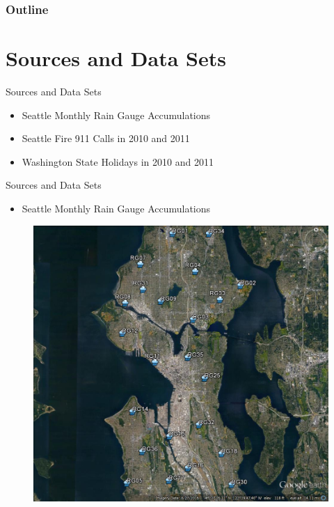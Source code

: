 \documentclass[t,11pt,compress,xcolor=table,hyperref={bookmarks=false}]{beamer}
\begin{document}
\begin{frame}
\frametitle{Outline}
\tableofcontents
\end{frame}




\section{Sources and Data Sets}


\begin{frame}{Sources and Data Sets}
\vspace{0.3cm}
\begin{itemize}
\Large
\item Seattle Monthly Rain Gauge Accumulations \cite{Daniels2018}
\item Seattle Fire 911 Calls in 2010 and 2011 \cite{FireData2018}
\item Washington State Holidays in 2010 and 2011 \cite{OfficeHolidays2010,OfficeHolidays2011}
\end{itemize}
\end{frame}



\begin{frame}{Sources and Data Sets}
\begin{itemize}
\item {\Large Seattle Monthly Rain Gauge Accumulations \cite{Daniels2018}}
\end{itemize}
\vspace{-0.6cm}
\begin{figure}[ht!]
\centering
\includegraphics[scale=0.18]{figs/SPU_DWW_RGs.jpg}
\end{figure}
\end{frame}
\end{document}
